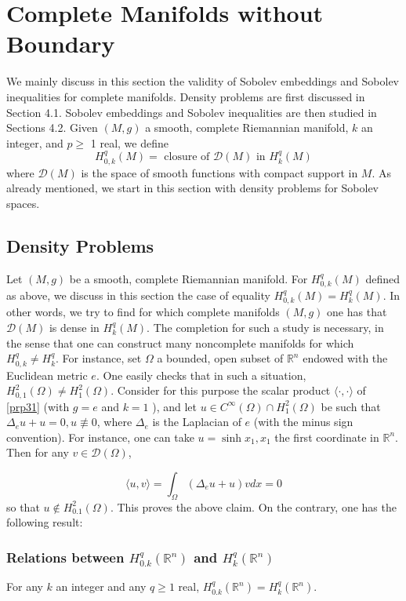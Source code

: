 \documentclass[12pt,hyperref,a4paper,UTF8]{ctexart}
\begin{document}
\newpage



\section{Complete Manifolds without Boundary}

We mainly discuss in this section the validity of Sobolev embeddings and Sobolev inequalities for complete manifolds. Density problems are first discussed in Section 4.1. Sobolev embeddings and Sobolev inequalities are then studied in Sections 4.2. 
Given $(M, g)$ a smooth, complete Riemannian manifold, $k$ an integer, and $p \geq$ 1 real, we define
$$
H_{0, k}^q(M)=\text { closure of } \mathcal{D}(M) \text { in } H_k^q(M)
$$
where $\mathcal{D}(M)$ is the space of smooth functions with compact support in $M$. As already mentioned, we start in this section with density problems for Sobolev spaces.

\subsection{Density Problems}
Let $(M, g)$ be a smooth, complete Riemannian manifold. For $H_{0, k}^q(M)$ defined as above, we discuss in this section the case of equality $H_{0, k}^q(M)=H_k^q(M)$. In other words, we try to find for which complete manifolds $(M, g)$ one has that
$\mathcal{D}(M)$ is dense in $H_k^q(M)$. The completion for such a study is necessary, in the sense that one can construct many noncomplete manifolds for which $H_{0, k}^q \neq H_k^q$. For instance, set $\Omega$ a bounded, open subset of $\mathbb{R}^n$ endowed with the Euclidean metric $e$. One easily checks that in such a situation, $H_{0,1}^2(\Omega) \neq H_1^2(\Omega)$. Consider for this purpose the scalar product $\langle\cdot, \cdot\rangle$ of \autoref{prp31} (with $g=e$ and $k=1$ ), and let $u \in C^{\infty}(\Omega) \cap H_1^2(\Omega)$ be such that $\Delta_e u+u=0, u \not \equiv 0$, where $\Delta_e$ is the Laplacian of $e$ (with the minus sign convention). For instance, one can take $u=\sinh x_1, x_1$ the first coordinate in $\mathbb{R}^n$. Then for any $v \in \mathcal{D}(\Omega)$,

$$
\langle u, v\rangle=\int_{\Omega}\left(\Delta_e u+u\right) v d x=0
$$
so that $u \notin H_{0.1}^2(\Omega)$. This proves the above claim. On the contrary, one has the following result:


\subsubsection{Relations between $H_{0 . k}^q\left(\mathbb{R}^n\right)$ and $H_k^q\left(\mathbb{R}^n\right)$}
\begin{Proposition}
    For any $k$ an integer and any $q \geq 1$ real, $H_{0 . k}^q\left(\mathbb{R}^n\right)=H_k^q\left(\mathbb{R}^n\right)$.
\label{prp41}
\end{Proposition}
\end{document}
